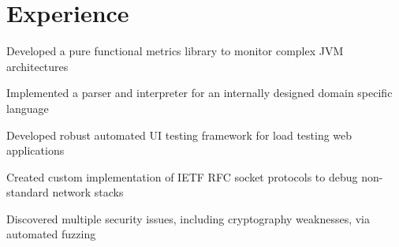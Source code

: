 \documentclass[letterpaper]{deedy-resume} %
\begin{document}
\hfill
%
%
\begin{minipage}[t]{0.66\textwidth} %


\section{Experience}

\vspace{1mm} %
\vspace{1mm} %

\vspace{\topsep} %
\begin{tightitemize}
    \item Developed a pure functional metrics library to monitor complex JVM 
        architectures
    \item Implemented a parser and interpreter for an internally designed domain 
        specific language
\end{tightitemize}

\sectionspace %


\vspace{1mm} %
\vspace{1mm} %

\begin{tightitemize}
    \item Developed robust automated UI testing framework for load testing web 
        applications
    \item Created custom implementation of IETF RFC socket protocols to debug 
        non-standard network stacks
    \item Discovered multiple security issues, including cryptography 
        weaknesses, via automated fuzzing
\end{tightitemize}


\end{minipage}
\end{document}
